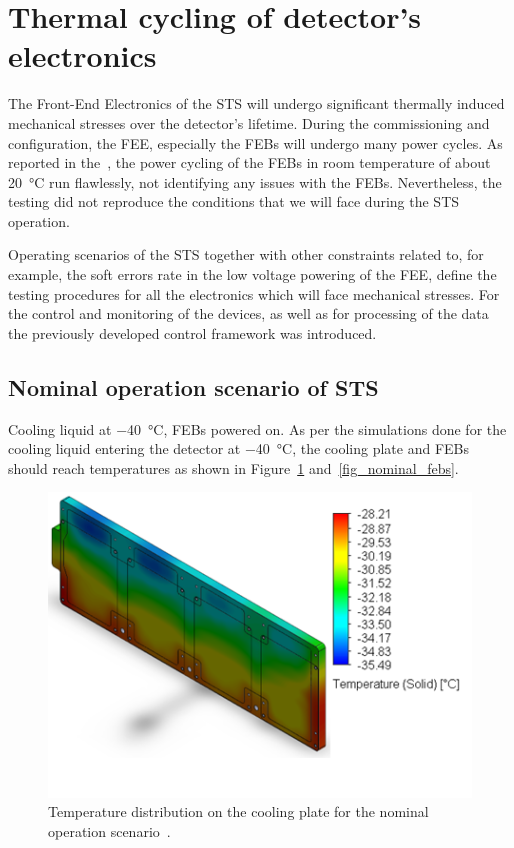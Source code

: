 \newpage
\section{Thermal cycling of detector's electronics}
\label{thermal_cycling}

The Front-End Electronics of the \gls{STS} will undergo significant thermally induced mechanical stresses over the detector's lifetime. During the commissioning and configuration, the \gls{FEE}, especially the \glspl{FEB} will undergo many power cycles. As reported in the~\cite{CBM_PR_2021}, the power cycling of the \glspl{FEB} in room temperature of about \SI{20}{\celsius} run flawlessly, not identifying any issues with the \glspl{FEB}. Nevertheless, the testing did not reproduce the conditions that we will face during the \gls{STS} operation.

Operating scenarios of the \gls{STS} together with other constraints related to, for example, the soft errors rate in the low voltage powering of the \gls{FEE}, define the testing procedures for all the electronics which will face mechanical stresses. For the control and monitoring of the devices, as well as for processing of the data the previously developed control framework was introduced. 
\subsection{Nominal operation scenario of STS}
\label{nominal}

Cooling liquid at \SI{-40}{\celsius}, \gls{FEB}s powered on.
    As per the simulations done for the cooling liquid entering the detector at  \SI{-40}{\celsius}, the cooling plate and \gls{FEB}s should reach temperatures as shown in Figure~\ref{fig_coolinkg_block_nominal} and~\ref{fig_nominal_febs}.

    
\begin{figure}[!h]
\centering
\includegraphics[width=0.6\columnwidth]{Chapter4/images/cooling_block_nominal.png}
\caption{Temperature distribution on the cooling plate for the nominal operation scenario~\cite{thermal_cycling}.}
\label{fig_coolinkg_block_nominal}
\end{figure}

